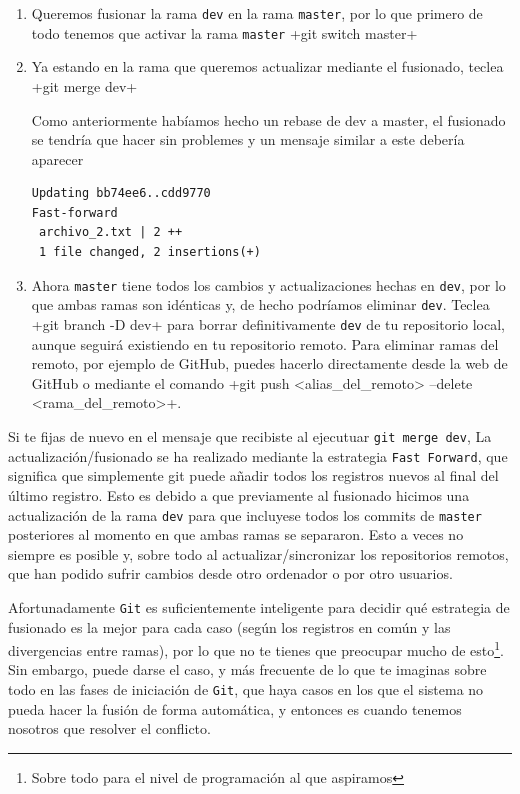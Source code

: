 \documentclass[a5paper, oneside,10pt]{article}
\begin{document}
    \begin{enumerate}
     \item Queremos fusionar la rama \verb+dev+ en la rama \verb+master+, por lo que primero de todo tenemos que activar la rama \verb+master+
     \cverb+git switch master+
     \item Ya estando en la rama que queremos actualizar mediante el fusionado, teclea
     \cverb+git merge dev+
     
     Como anteriormente habíamos hecho un rebase de dev a master, el fusionado se tendría que hacer sin problemes y un mensaje similar a este debería aparecer
     \begin{lstlisting}[style=custom]
Updating bb74ee6..cdd9770
Fast-forward
 archivo_2.txt | 2 ++
 1 file changed, 2 insertions(+)
     \end{lstlisting}
     
     \item Ahora \verb+master+ tiene todos los cambios y actualizaciones hechas en \verb+dev+, por lo que ambas ramas son idénticas y, de hecho podríamos eliminar \verb+dev+. Teclea 
     \cverb+git branch -D dev+ para borrar definitivamente \verb+dev+ de tu repositorio local, aunque seguirá existiendo en tu repositorio remoto. Para eliminar ramas del remoto, por ejemplo de GitHub, puedes hacerlo directamente desde la web de GitHub o mediante el comando \cverb+git push <alias_del_remoto>  --delete <rama_del_remoto>+.

    \end{enumerate}
    
    Si te fijas de nuevo en el mensaje que recibiste al ejecutuar \verb+git merge dev+, La actualización/fusionado se ha realizado mediante la estrategia \verb+Fast Forward+, que significa que simplemente git puede añadir todos los registros nuevos al final del último registro. Esto es debido a que previamente al fusionado hicimos una actualización de la rama \verb+dev+ para que incluyese todos los commits de \verb+master+ posteriores al momento en que ambas ramas se separaron. Esto a veces no siempre es posible y, sobre todo al actualizar/sincronizar los repositorios remotos, que han podido sufrir cambios desde otro ordenador o por otro usuarios. 
    
    Afortunadamente \verb+Git+ es suficientemente inteligente para decidir qué estrategia de fusionado es la mejor para cada caso (según los registros en común y las divergencias entre ramas), por lo que no te tienes que preocupar mucho de esto\footnote{Sobre todo para el nivel de programación al que aspiramos}. Sin embargo, puede darse el caso, y más frecuente de lo que te imaginas sobre todo en las fases de iniciación de \verb+Git+, que haya casos en los que el sistema no pueda hacer la fusión de forma automática, y entonces es cuando tenemos nosotros que resolver el conflicto.
  
\end{document}
